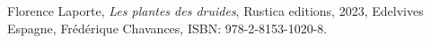 
\renewcommand{\refname}{}
\begin{thebibliography}{9}

    Florence Laporte,
    \textit{Les plantes des druides},
    Rustica editions, 2023,
    Edelvives Espagne,
    Frédérique Chavances,
    ISBN: 978-2-8153-1020-8.
    
\end{thebibliography}